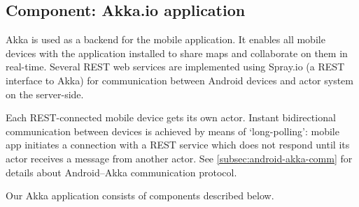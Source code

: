 %
%
%
%
%

\subsection{Component: Akka.io application}
\label{subsec:component-akka}


Akka is used as a backend for the mobile application. It enables all mobile devices with the application installed to share maps and collaborate on them in real-time. Several REST web services are implemented using Spray.io (a REST interface to Akka) for communication between Android devices and actor system on the server-side.

Each REST-connected mobile device gets its own actor. Instant bidirectional communication between devices is achieved by means of `long-polling': mobile app initiates a connection with a REST service which does not respond until its actor receives a message from another actor. See \cref{subsec:android-akka-comm} for details about Android--Akka communication protocol.

Our Akka application consists of components described below.

